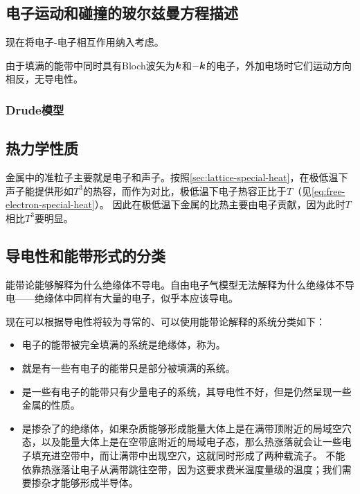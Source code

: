 \subsection{电子运动和碰撞的玻尔兹曼方程描述}

现在将电子-电子相互作用纳入考虑。

由于填满的能带中同时具有Bloch波矢为$\vb*{k}$和$-\vb*{k}$的电子，外加电场时它们运动方向相反，无导电性。

\subsubsection{Drude模型}

\subsection{热力学性质}


金属中的准粒子主要就是电子和声子。按照\autoref{sec:lattice-special-heat}，在极低温下声子能提供形如$T^3$的热容，而作为对比，极低温下电子热容正比于$T$（见\eqref{eq:free-electron-special-heat}）。
因此在极低温下金属的比热主要由电子贡献，因为此时$T$相比$T^3$要明显。

\subsection{导电性和能带形式的分类}\label{sec:conductor-classification}

能带论能够解释为什么绝缘体不导电。自由电子气模型无法解释为什么绝缘体不导电——绝缘体中同样有大量的电子，似乎本应该导电。


现在可以根据导电性将较为寻常的、可以使用能带论解释的系统分类如下：
\begin{itemize}
    \item 电子的能带被完全填满的系统是绝缘体，称为。
    \item {}就是有一些有电子的能带只是部分被填满的系统。
    \item {}是一些有电子的能带只有少量电子的系统，其导电性不好，但是仍然呈现一些金属的性质。
    \item {}是掺杂了的绝缘体，如果杂质能够形成能量大体上是在满带顶附近的局域空穴态，以及能量大体上是在空带底附近的局域电子态，那么热涨落就会让一些电子填充进空带中，而让满带中出现空穴，这就同时形成了两种载流子。
    不能依靠热涨落让电子从满带跳往空带，因为这要求费米温度量级的温度；我们需要掺杂才能够形成半导体。
\end{itemize}

